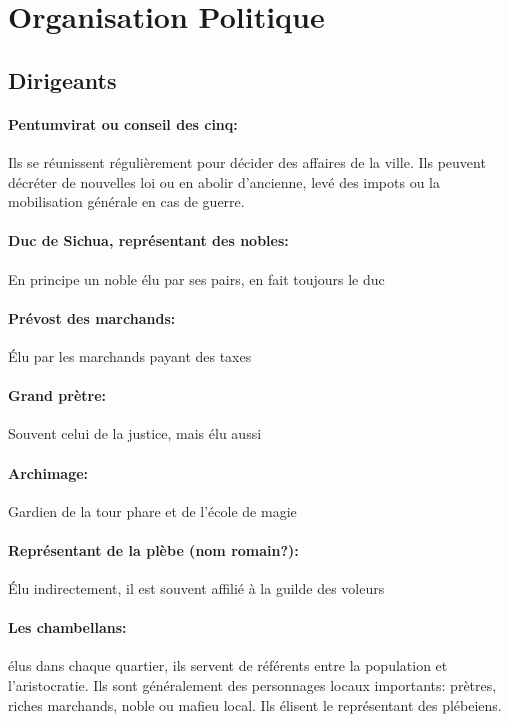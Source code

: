 \section{Organisation Politique}

\subsection{Dirigeants}

   \paragraph{Pentumvirat ou conseil des cinq: }
       Ils se réunissent régulièrement pour décider des affaires de la 
       ville. Ils peuvent décréter de nouvelles loi ou en abolir d'ancienne,
       levé des impots ou la mobilisation générale en cas de guerre. \\

   \paragraph{Duc de Sichua, représentant des nobles: }
       En principe un noble élu par ses pairs, en fait toujours le duc \\
   \paragraph{Prévost des marchands: }
       Élu par les marchands payant des taxes \\
   \paragraph{Grand prètre: } 
       Souvent celui de la justice, mais élu aussi \\
   \paragraph{Archimage: }
       Gardien de la tour phare et de l'école de magie \\
   \paragraph{Représentant de la plèbe (nom romain?): }
       Élu indirectement, il est souvent affilié à la guilde des voleurs \\

   \paragraph{Les chambellans:} élus dans chaque quartier, ils servent de référents
       entre la population et l'aristocratie. Ils sont généralement des
       personnages locaux importants: prètres, riches marchands, noble
       ou mafieu local. Ils élisent le représentant des plébeiens. \\

